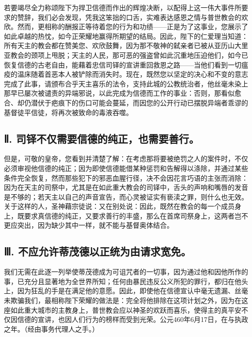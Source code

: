 若要竭尽全力称颂陛下为捍卫信德而作出的辉煌决断，以配得上这一伟大事件所要求的赞辞，我们必会发现，凭我这笨拙的口舌，实难表达感恩之情与普世教会的欢欣。然而，更相称的酬报正等待着您的行为和功绩——正是为了这事业，您展示了如此卓越的热忱，如今正荣耀地赢得所期望的结局。因此，陛下的仁爱理当知道：所有天主的教会都在赞美您、欢欣鼓舞，因为那不敬神的弑亲者已被从亚历山大里亚教会的颈项上甩脱；天主的人民，那可恶的强盗曾如此沉重地压迫他们，如今已恢复信德的古老自由，能藉着忠信司铎的宣讲重回救恩之路——当他们看到一切瘟疫的温床随着首恶本人被铲除而消失时。现在，既然您以坚定的决心和不变的意志完成了此事，请颁布合乎天主喜乐的法令，支持此城的公教统治者，他丝毫未染上那早已屡次被谴责的异端邪说，以此完成为信德而工作的事业：否则，那看似愈合、却仍潜伏于疤痕下的伤口可能会蔓延，而因您的公开行动已摆脱异端者乖谬的基督徒平信徒，将再次被致命的毒液吞噬。\par


\subsection{Ⅱ. 司铎不仅需要信德的纯正，也需要善行。}

但是，可敬的皇帝，您看到并清楚了解：在考虑那将要被绝罚之人的案件时，不仅必须审视他信德的纯正；因为即使信德能借某种惩罚和告解得以涤除，并通过某些条件完全恢复，然而那些犯下的邪恶血腥行径，决不会因花言巧语的主张而消除：因为在天主的司祭中，尤其是在如此重大教会的司铎中，舌头的声响和嘴唇的发音是不够的；若天主以自己的声音宣告，而心灵被证实有亵渎之罪，则什么也无效。关于这样的人，圣神藉宗徒说：又在别处说：因此，既然在教会的每一个成员身上，既要求真信德的纯正，又要求善行的丰盛，那么在首席司祭身上，这两者岂不更应突出，因为缺少其中一样，就不能与基督奥体结合。\par


\subsection{Ⅲ. 不应允许蒂茂德以正统为由请求宽免。}

我们无需在此逐一列举使蒂茂德成为可诅咒者的一切事，因为通过他和因他所作的事，已充分且显著地为全世界所知；任何由暴民违反公义所犯的罪行，都归在他头上，因为狂乱的手是在满足他的意愿。因此，即使他在信德宣认中毫无遗漏、丝毫未欺骗我们，最相称陛下荣耀的做法是：完全将他排除在这项计划之外，因为在这座如此重大城市的主教身上，普世教会应以神圣的欢跃而喜乐，使得主的真平安不仅因信德的宣讲，也因人们行为的榜样而受到光荣。公元460年6月17日，在与执政之年。（经由事务代理人之手。）\par


